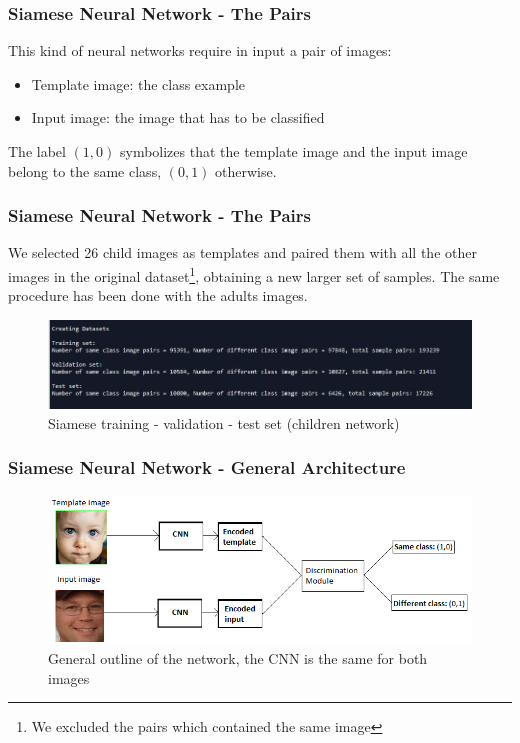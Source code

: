 \documentclass{beamer}
\begin{document}
	\begin{frame}
		\frametitle{Siamese Neural Network - The Pairs}
		This kind of neural networks require in input a pair of images:
		\begin{itemize}
			\item Template image: the class example
			\item Input image: the image that has to be classified
		\end{itemize}		
		The label $(1,0)$ symbolizes that the template image and the input image belong to the same class, $(0,1)$ otherwise.
	\end{frame}
	
	\begin{frame}
		\frametitle{Siamese Neural Network - The Pairs}
		We selected 26 child images as templates and paired them with all the other images in the original dataset\footnote{We excluded the pairs which contained the same image}, obtaining a new larger set of samples. The same procedure has been done with the adults images.
		\begin{figure}
			\centering
			\includegraphics[width=\textwidth]{img/siamese_training_set_children.JPG}
    		\caption{Siamese training - validation - test set (children network)}
    		\label{fig:siamese_general}
		\end{figure}
	\end{frame}
	
	\begin{frame}
		\frametitle{Siamese Neural Network - General Architecture}		
		\begin{figure}
			\centering
			\includegraphics[width=\textwidth]{img/siamese_schema_generale.png}
    		\caption{General outline of the network, the CNN is the same for both images}
    		\label{fig:siamese_dataset}
		\end{figure}
	\end{frame}
	
\end{document}
